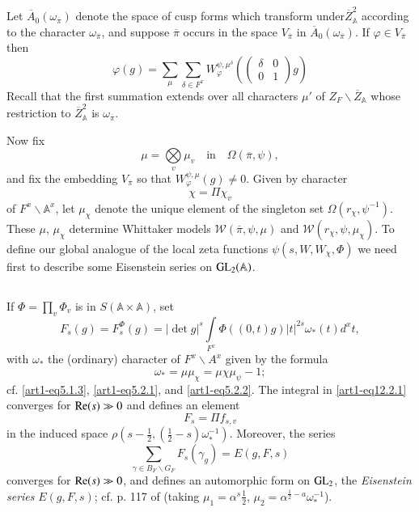 \subsection{}\label{art1-sec12.1}
Let $\overline{A}_{0}(\omega_{\overline{\pi}})$ denote the space of cusp forms which transform under\pageoriginale $\overline{Z}_{\mathbb{A}}^{2}$ according to the character $\omega_{\overline{\pi}}$, and suppose $\overline{\pi}$ occurs in the space $V_{\overline{\pi}}$ in $\overline{A}_{0}(\omega_{\overline{\pi}})$. If $\varphi\in V_{\overline{\pi}}$ then
\setcounter{equation}{0}
\begin{equation}
\varphi(g)=\sum\limits_{\mu}\sum\limits_{\delta\in F^{x}}W^{\psi,\mu^{\delta}}_{\varphi}\left(\left(\begin{matrix} \delta & 0\\ 0 & 1\end{matrix}\right)g\right)\label{art1-eq12.1.1}
\end{equation}
Recall that the first summation extends over all characters $\mu'$ of $Z_{F}\backslash \overline{Z}_{\mathbb{A}}$ whose restriction to $\overline{Z}_{\mathbb{A}}^{2}$ is $\omega_{\overline{\pi}}$.


Now fix
$$
\mu=\bigotimes\limits_{v}\mu_{v}\quad\text{in}\quad \Omega(\overline{\pi},\psi),
$$
and fix the embedding $V_{\overline{\pi}}$ so that $W^{\psi,\mu}_{\varphi}(g)\neq 0$. Given by character
$$
\chi=\Pi \chi_{v}
$$
of $F^{x}\backslash \mathbb{A}^{x}$, let $\mu_{\chi}$ denote the unique element of the singleton set $\Omega(r_{\chi},\psi^{-1})$. These $\mu$, $\mu_{\chi}$ determine Whittaker models $\mathscr{W}(\overline{\pi},\psi,\mu)$ and $\mathscr{W}(r_{\chi},\psi,\mu_{\chi})$. To define our global analogue of the local zeta functions $\psi(s,W,W_{\chi},\Phi)$ we need first to describe some Eisenstein series on $\mathrm{GL}_{2}(\mathbb{A})$.

\subsection{}\label{art1-sec12.2}
If $\Phi=\prod\limits_{v}\Phi_{v}$ is in $S(\mathbb{A}\times \mathbb{A})$, set
\setcounter{equation}{0}
\begin{equation}
F_{s}(g)=F^{\Phi}_{s}(g)=|\det g|^{s}\int\limits_{F^{x}}\Phi((0,t)g)|t|^{2s}\omega_{*}(t)d^{x}t,\label{art1-eq12.2.1}
\end{equation}
with $\omega_{*}$ the (ordinary) character of $F^{x}\backslash A^{x}$ given by the formula
$$
\omega_{*}=\mu\mu_{\chi}=\mu\chi\mu_{\psi}-1;
$$
cf. \eqref{art1-eq5.1.3}, \eqref{art1-eq5.2.1}, and \eqref{art1-eq5.2.2}. The integral in \eqref{art1-eq12.2.1} converges for $\mathrm{Re}(s)\gg 0$ and defines an element
$$
F_{s}=\Pi f_{s,v}
$$
in the induced space $\rho\left(s-\frac{1}{2},\left(\frac{1}{2}-s\right)\omega^{-1}_{*}\right)$. Moreover, the series
$$
\sum\limits_{\gamma\in B_{F}\backslash G_{F}}F_{s}(\gamma_{g})=E(g,F,s)
$$
converges for $\mathrm{Re}(s)\gg 0$, and defines an automorphic form on $\mathrm{GL}_{2}$, the {\em Eisenstein series} $E(g,F,s)$; cf. p. 117 of \cite{Ja} (taking $\mu_{1}=\alpha^{s}\frac{1}{2}$, $\mu_{2}=\alpha^{\frac{1}{2}-a}\omega^{-1}_{*}$).

